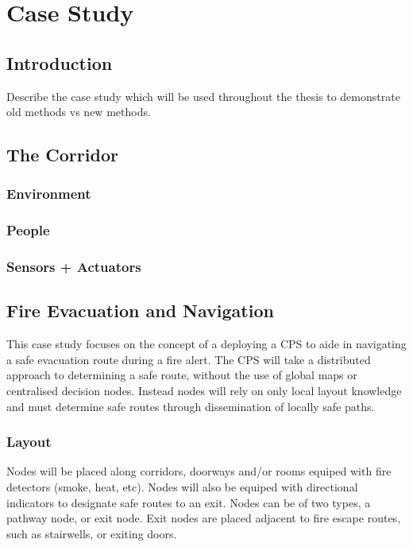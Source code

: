 \chapter{Case Study}
\label{chap:Case Study}
\section{Introduction}
\label{sec:Introduction}
Describe the case study which will be used throughout the thesis to demonstrate old methods vs new methods.

\section{The Corridor}

\subsection{Environment}
\label{subsec:Environment}
\subsection{People}
\label{subsec:People}
\subsection{Sensors + Actuators}
\label{subsec:Sensors + Actuators}

\section{Fire Evacuation and Navigation}
This case study focuses on the concept of a deploying a CPS to aide in navigating a safe evacuation route during a fire alert. The CPS will take a distributed approach to determining a safe route, without the use of global maps or centralised decision nodes. Instead nodes will rely on only local layout knowledge and must determine safe routes through dissemination of locally safe paths.

\subsection{Layout}
Nodes will be placed along corridors, doorways and/or rooms equiped with fire detectors (smoke, heat, etc). Nodes will also be equiped with directional indicators to designate safe routes to an exit. Nodes can be of two types, a pathway node, or exit node. Exit nodes are placed adjacent to fire escape routes, such as stairwells, or exiting doors.

